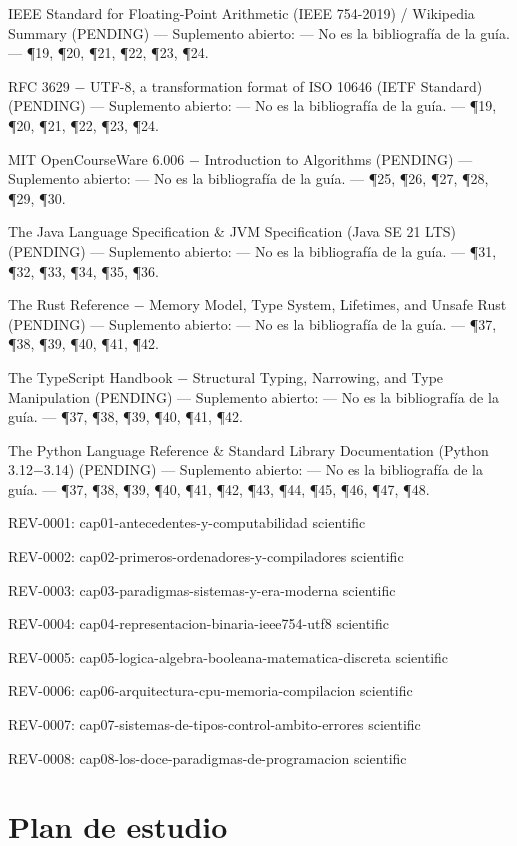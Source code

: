 \documentclass{book}
\begin{document}
\noindent IEEE Standard for Floating-Point Arithmetic (IEEE 754-2019) / Wikipedia Summary (PENDING) --- Suplemento abierto: --- No es la bibliografía de la guía. --- \P19, \P20, \P21, \P22, \P23, \P24.

\noindent RFC 3629 \(-\) UTF-8, a transformation format of ISO 10646 (IETF Standard) (PENDING) --- Suplemento abierto: --- No es la bibliografía de la guía. --- \P19, \P20, \P21, \P22, \P23, \P24.

\noindent MIT OpenCourseWare 6.006 \(-\) Introduction to Algorithms (PENDING) --- Suplemento abierto: --- No es la bibliografía de la guía. --- \P25, \P26, \P27, \P28, \P29, \P30.

\noindent The Java Language Specification \& JVM Specification (Java SE 21 LTS) (PENDING) --- Suplemento abierto: --- No es la bibliografía de la guía. --- \P31, \P32, \P33, \P34, \P35, \P36.

\noindent The Rust Reference \(-\) Memory Model, Type System, Lifetimes, and Unsafe Rust (PENDING) --- Suplemento abierto: --- No es la bibliografía de la guía. --- \P37, \P38, \P39, \P40, \P41, \P42.

\noindent The TypeScript Handbook \(-\) Structural Typing, Narrowing, and Type Manipulation (PENDING) --- Suplemento abierto: --- No es la bibliografía de la guía. --- \P37, \P38, \P39, \P40, \P41, \P42.

\noindent The Python Language Reference \& Standard Library Documentation (Python 3.12\(-\)3.14) (PENDING) --- Suplemento abierto: --- No es la bibliografía de la guía. --- \P37, \P38, \P39, \P40, \P41, \P42, \P43, \P44, \P45, \P46, \P47, \P48.

\noindent REV-0001: cap01-antecedentes-y-computabilidad scientific

\noindent REV-0002: cap02-primeros-ordenadores-y-compiladores scientific

\noindent REV-0003: cap03-paradigmas-sistemas-y-era-moderna scientific

\noindent REV-0004: cap04-representacion-binaria-ieee754-utf8 scientific

\noindent REV-0005: cap05-logica-algebra-booleana-matematica-discreta scientific

\noindent REV-0006: cap06-arquitectura-cpu-memoria-compilacion scientific

\noindent REV-0007: cap07-sistemas-de-tipos-control-ambito-errores scientific

\noindent REV-0008: cap08-los-doce-paradigmas-de-programacion scientific
\chapter{Plan de estudio}
\end{document}
